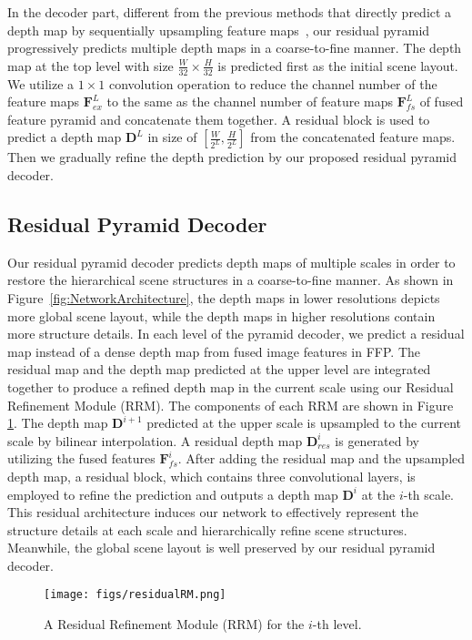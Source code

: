 \documentclass{article}
\newcommand{\exF}{\mathbf{F}_{ex}}
\newcommand{\fsF}{\mathbf{F}_{fs}}
\newcommand{\pD}{\mathbf{D}}
\newcommand{\rD}{\mathbf{D}_{res}}
\begin{document}
In the decoder part, different from the previous methods that directly predict a depth map by sequentially upsampling feature maps~\cite{laina2016deeper,hu2019revisiting}, our residual pyramid progressively predicts multiple depth maps in a coarse-to-fine manner. 
The depth map at the top level with size $\frac{W}{32} \times \frac{H}{32}$ is predicted first as the initial scene layout. 
We utilize a $1\times1$ convolution operation to reduce the channel number of the feature maps $\exF^L$ to the same as the channel number of feature maps $\fsF^L$ of fused feature pyramid and concatenate them together. 
A residual block is used to predict a depth map $\pD^L$ in size of $[\frac{W}{2^L}, \frac{H}{2^L}]$ from the concatenated feature maps. 
Then we gradually refine the depth prediction by our proposed residual pyramid decoder.
 

\subsection{Residual Pyramid Decoder}
\label{sec:RPD}
Our residual pyramid decoder predicts depth maps of multiple scales in order to restore the hierarchical scene structures in a coarse-to-fine manner. 
As shown in Figure~\ref{fig:NetworkArchitecture}, the depth maps in lower resolutions depicts more global scene layout, while the depth maps in higher resolutions contain more structure details.
In each level of the pyramid decoder, we predict a residual map instead of a dense depth map from fused image features in FFP.
The residual map and the depth map predicted at the upper level are integrated together to produce a refined depth map in the current scale using our Residual Refinement Module (RRM). 
The components of each RRM are shown in Figure \ref{fig:residualRM}.
The depth map $\pD^{i+1}$ predicted at the upper scale is upsampled to the current scale by bilinear interpolation. 
A residual depth map $\rD^{i}$ is generated by utilizing the fused features $\fsF^{i}$. 
After adding the residual map and the upsampled depth map, a residual block, which contains three convolutional layers, is employed to refine the prediction and outputs a depth map $\pD^{i}$ at the $i$-th scale.
This residual architecture induces our network to effectively represent the structure details at each scale and hierarchically refine scene structures.
Meanwhile, the global scene layout is well preserved by our residual pyramid decoder.

\begin{figure}[t]
	\centering 
	\texttt{[image: figs/residualRM.png]}
	\caption{A Residual Refinement Module (RRM) for the $i$-{th} level.}
	\label{fig:residualRM}
\end{figure} 
\end{document}
